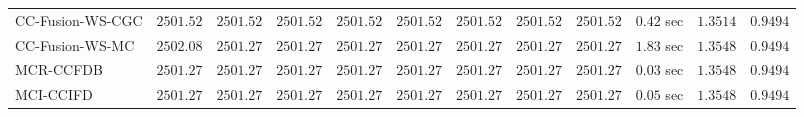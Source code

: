 \begin{table}[H]
\begin{tabular}{lrrrrrrrrrrr}
    CC-Fusion-WS-CGC & $      2501.52$ & $      2501.52$ & $      2501.52$ & $      2501.52$ & $      2501.52$ & $      2501.52$ & $      2501.52$ & $      2501.52$ & $         0.42$ sec    & $       1.3514$  & $       0.9494$ \\ 
     CC-Fusion-WS-MC & $      2502.08$ & $      2501.27$ & $      2501.27$ & $      2501.27$ & $      2501.27$ & $      2501.27$ & $      2501.27$ & $      2501.27$ & $         1.83$ sec    & $       1.3548$  & $       0.9494$ \\ 
\cmidrule{1-1} 
           MCR-CCFDB & $      2501.27$ & $      2501.27$ & $      2501.27$ & $      2501.27$ & $      2501.27$ & $      2501.27$ & $      2501.27$ & $      2501.27$ & $         0.03$ sec    & $       1.3548$  & $       0.9494$ \\ 
\cmidrule{1-1} 
           MCI-CCIFD & $      2501.27$ & $      2501.27$ & $      2501.27$ & $      2501.27$ & $      2501.27$ & $      2501.27$ & $      2501.27$ & $      2501.27$ & $         0.05$ sec    & $       1.3548$  & $       0.9494$ \\ 
\bottomrule
\end{tabular}
\end{table}

